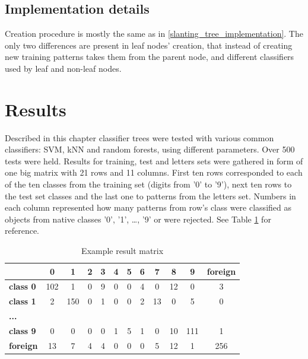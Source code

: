 \subsection{Implementation details}

Creation procedure is mostly the same as in \ref{slanting_tree_implementation}. The only two differences are present in leaf nodes' creation, that instead of creating new training patterns takes them from the parent node, and different classifiers used by leaf and non-leaf nodes.

\section{Results}

Described in this chapter classifier trees were tested with various common classifiers: SVM, kNN and random forests, using different parameters. Over 500 tests were held. Results for training, test and letters sets were gathered in form of one big matrix with 21 rows and 11 columns. First ten rows corresponded to each of the ten classes from the training set (digits from '0' to '9'), next ten rows to the test set classes and the last one to patterns from the letters set. Numbers in each column represented how many patterns from row's class were classified as objects from native classes '0', '1', \dots, '9' or were rejected. See Table \ref{example_result_matrix} for reference.

\begin{table}[htp]
	\centering
	\caption{Example result matrix}
	\label{example_result_matrix}
	\begin{tabular}{l|c|c|c|c|c|c|c|c|c|c|c|}
		\cline{2-12}
		& \textbf{0} & \textbf{1} & \textbf{2} & \textbf{3} & \textbf{4} & \textbf{5} & \textbf{6} & \textbf{7} & \textbf{8} & \textbf{9} & \textbf{foreign} \\ \hline
		\multicolumn{1}{|l|}{\textbf{class 0}} & 102        & 1          & 0          & 9          & 0          & 0          & 4          & 0          & 12         & 0          & 3                \\ \hline
		\multicolumn{1}{|l|}{\textbf{class 1}} & 2          & 150        & 0          & 1          & 0          & 0          & 2          & 13         & 0          & 5          & 0                \\ \hline
		\multicolumn{1}{|l|}{\textbf{...}}     &            &            &            &            &            &            &            &            &            &            &                  \\ \hline
		\multicolumn{1}{|l|}{\textbf{class 9}} & 0          & 0          & 0          & 0          & 1          & 5          & 1          & 0          & 10         & 111        & 1                \\ \hline
		\multicolumn{1}{|l|}{\textbf{foreign}} & 13         & 7          & 4          & 4          & 0          & 0          & 0          & 5          & 12         & 1          & 256              \\ \hline
	\end{tabular}
\end{table}

